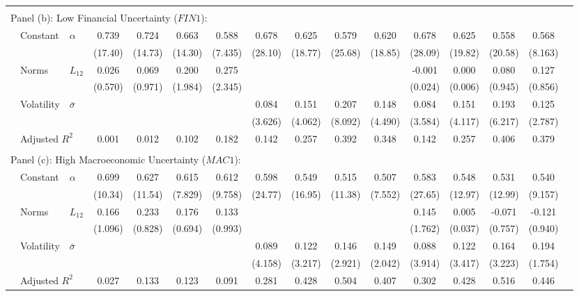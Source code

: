 \documentclass{article}
\begin{document}
\begin{sidewaystable}
\begin{center}
\begin{small}
\begin{tabular}{ll l c c c c c c c c c c c c c}
             &&&&&&&\\
             \multicolumn{12}{l}{Panel (b): Low Financial Uncertainty ($FIN1$): }\\
             & Constant & $\alpha$ & 0.739&0.724&0.663&0.588&0.678&0.625&0.579&0.620&0.678&0.625&0.558&0.568\\
             &&&(17.40)&(14.73)&(14.30)&(7.435)&(28.10)&(18.77)&(25.68)&(18.85)&(28.09)&(19.82)&(20.58)&(8.163)\\
             & Norms & $L_{12}$& 0.026&0.069&0.200&0.275&&&&&-0.001&0.000&0.080&0.127\\
             &&&(0.570)&(0.971)&(1.984)&(2.345)&&&&&(0.024)&(0.006)&(0.945)&(0.856)\\
             & Volatility & $\bar{\sigma}$&&&&&0.084&0.151&0.207&0.148&0.084&0.151&0.193&0.125\\
             &&&&&&&(3.626)&(4.062)&(8.092)&(4.490)&(3.584)&(4.117)&(6.217)&(2.787)\\
             & \multicolumn{2}{l}{Adjusted $R^2$}&0.001&0.012&0.102&0.182&0.142&0.257&0.392&0.348&0.142&0.257&0.406&0.379\\

             &&&&&&&&\\
             \multicolumn{9}{l}{Panel (c): High Macroeconomic Uncertainty ($MAC1$): }\\
             & Constant & $\alpha$ & 0.699&0.627&0.615&0.612&0.598&0.549&0.515&0.507&0.583&0.548&0.531&0.540\\
             &&&(10.34)&(11.54)&(7.829)&(9.758)&(24.77)&(16.95)&(11.38)&(7.552)&(27.65)&(12.97)&(12.99)&(9.157)\\
             & Norms & $L_{12}$&0.166&0.233&0.176&0.133&&&&&0.145&0.005&-0.071&-0.121\\
             &&&(1.096)&(0.828)&(0.694)&(0.993)&&&&&(1.762)&(0.037)&(0.757)&(0.940)\\
             & Volatility & $\bar{\sigma}$&&&&&0.089&0.122&0.146&0.149&0.088&0.122&0.164&0.194\\
             &&&&&&&(4.158)&(3.217)&(2.921)&(2.042)&(3.914)&(3.417)&(3.223)&(1.754)\\
             & \multicolumn{2}{l}{Adjusted $R^2$}&0.027&0.133&0.123&0.091&0.281&0.428&0.504&0.407&0.302&0.428&0.516&0.446\\


\end{tabular}
\end{small}
\end{center}
\end{sidewaystable}
\end{document}
